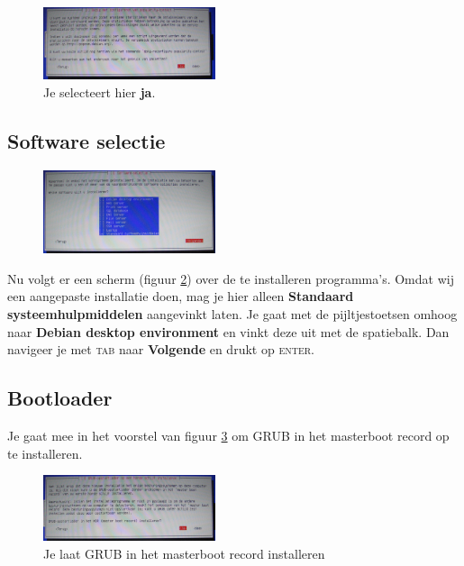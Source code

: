 \documentclass[12pt,a4paper]{article}
\begin{document}
\begin{figure}[H]
\centering
\includegraphics[width=0.45\textwidth]{populariteits-contest-scherm}
\caption{Je selecteert hier \textbf{ja}.}
\label{fig:popcon}
\end{figure}

\subsection{Software selectie}

\begin{figure}[H]
\centering
\includegraphics[width=0.45\textwidth]{software-selectie-scherm}
\label{fig:software-selectie-scherm}
\end{figure}

Nu volgt er een scherm (figuur \ref{fig:software-selectie-scherm}) over de te installeren programma's. Omdat wij een aangepaste installatie doen, mag je hier alleen \textbf{Standaard systeemhulpmiddelen} aangevinkt laten. Je gaat met de pijltjestoetsen omhoog naar \textbf{Debian desktop environment} en vinkt deze uit met de spatiebalk. Dan navigeer je met \textsc{tab} naar \textbf{Volgende} en drukt op \textsc{enter}.

\subsection{Bootloader}

Je gaat mee in het voorstel van figuur \ref{fig:grub} om GRUB in het masterboot record op te installeren.


\begin{figure}[H]
\centering
\includegraphics[width=0.45\textwidth]{grub-installatie-scherm}
\caption{Je laat GRUB in het masterboot record installeren}
\label{fig:grub}
\end{figure}
\end{document}
